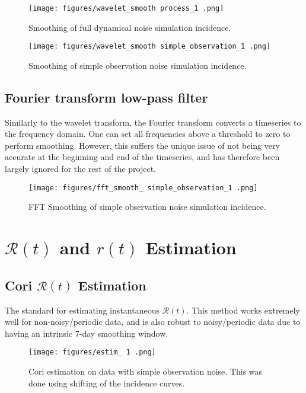 \documentclass{article}
\newcommand{\nR}{\mathscr{R}}
\begin{document}
\clearpage
\begin{figure}[h!]
    \centering
    \texttt{[image: figures/wavelet\_smooth process\_1 .png]}
    \caption{Smoothing of full dynamical noise simulation incidence.}
\end{figure}

\clearpage
\begin{figure}[h!]
    \centering
    \texttt{[image: figures/wavelet\_smooth simple\_observation\_1 .png]}
    \caption{Smoothing of simple observation noise simulation incidence.}
\end{figure}



\subsection{Fourier transform low-pass filter}
Similarly to the wavelet transform, the Fourier transform converts a timeseries to the frequency domain. One can set all frequencies above a threshold to zero to perform smoothing. However, this suffers the unique issue of not being very accurate at the beginning and end of the timeseries, and has therefore been largely ignored for the rest of the project.

\clearpage
\begin{figure}[h!]
    \centering
    \texttt{[image: figures/fft\_smooth\_ simple\_observation\_1 .png]}
    \caption{FFT Smoothing of simple observation noise simulation incidence.}
\end{figure}

\section {$\nR(t)$ and $r(t)$ Estimation}
\subsection{Cori $\nR(t)$ Estimation}
The standard for estimating instantaneous $\nR(t)$. This method works extremely well for non-noisy/periodic data, and is also robust to noisy/periodic data due to having an intrinsic 7-day smoothing window. 

\clearpage
\begin{figure}[h!]
    \centering
    \texttt{[image: figures/estim\_ 1 .png]}
    \caption{Cori estimation on data with simple observation noise. This was done using shifting of the incidence curves.}
\end{figure}
\end{document}
